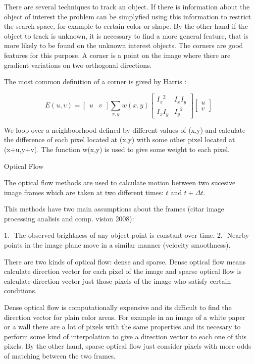  


There are several techniques to track an object. If there is information about the object of interest the problem 
can be simplyfied using this information to restrict the search space, for example to certain color or shape.
 By the other hand if the object to track is unknown, it is necessary to find a more general feature, that is 
more likely to be found on the unknown interest objects. The corners are good features for this purpose. A corner 
is a point on the image where there are gradient variations on two orthogonal directions.

The most common definition of a corner is gived by Harris :

$$
E(u,v) = \begin{bmatrix} u & v \end{bmatrix} \sum\limits_{x,y} w(x,y) \begin{bmatrix} {I_x}^2 & I_x I_y \\ I_x I_y & {I_y}^2 \end{bmatrix} \begin{bmatrix} u \\ v \end{bmatrix}
$$

We loop over a neighboorhood defined by different values of (x,y) and calculate 
the difference of each pixel located at (x,y) with some other pixel located at (x+u,y+v). 
The function w(x,y) is used to give some weight to each pixel. 


Optical Flow

The optical flow methods are used to calculate motion between two sucesive image frames which are taken
 at two different times: $t$ and $t + \Delta t$.

This methods have two main assumptions about the frames (citar image processing analisis and comp. vision 2008):

1.- The observed brightness of any object point is constant over time.
2.- Nearby points in the image plane move in a similar manner (velocity smoothness).


There are two kinds of optical flow: dense and sparse. Dense optical flow means  calculate direction vector for each pixel of the image and sparse optical flow is calculate direction vector just those pixels of the image 
who satisfy certain conditions.

Dense optical flow is computationally expensive and its difficult to find the direction vector 
for plain color areas. For example in an image of a white paper or a wall
there are a lot of pixels with the same properties and its necesary to perform some kind of interpolation to give a direction vector
 to each one of this pixels. 
By the other hand, sparse optical flow just consider pixels with more odds of matching between the two frames.

